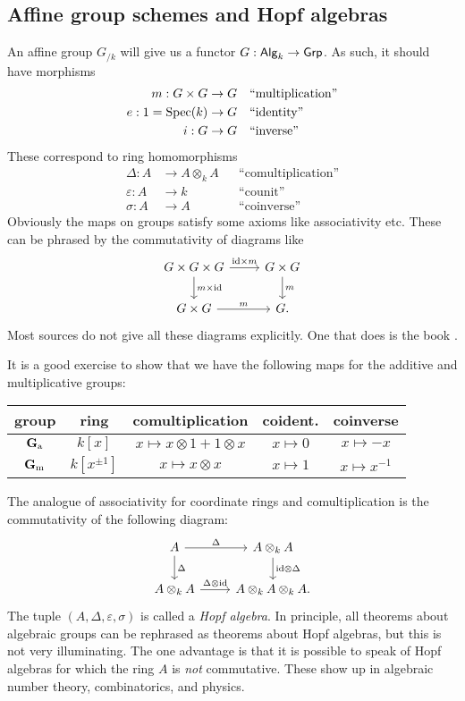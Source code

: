 \subsection{Affine group schemes and Hopf algebras}

An affine group $G_{/k}$ will give us a functor $G:\mathsf{Alg}_{k}\to \mathsf{Grp}$. As 
such, it should have morphisms 
\begin{align*}
  m :G\times G &\to G && \text{``multiplication''} \\
  e:1=\operatorname{Spec}(k) &\to G && \text{``identity''} \\
  i:G &\to G && \text{``inverse''}
\end{align*}
These correspond to ring homomorphisms 
\begin{align*}
  \Delta:A &\to A\otimes_k A && \text{``comultiplication''} \\
  \varepsilon : A &\to k && \text{``counit''} \\
  \sigma:A &\to A && \text{``coinverse''}
\end{align*}
Obviously the maps on groups satisfy some axioms like associativity etc. These 
can be phrased by the commutativity of diagrams like 
\[\begin{tikzcd}
  G\times G\times G \ar[r, "\id\times m"] \ar[d, "m\times \id"] 
    & G\times G \ar[d, "m"] \\ 
  G\times G \ar[r, "m"] 
    & G .
\end{tikzcd}\]
Most sources do not give all these diagrams explicitly. One that does is 
the book \cite{waterhouse-1979}. 

It is a good exercise to show that we have the following maps for the additive 
and multiplicative groups:
\begin{center}
\begin{tabular}{c|cccc}
group & ring & comultiplication & coident. & coinverse \\ \hline
$\mathbf{G}_\mathrm{a}$ & $k[x]$ & $x\mapsto x\otimes 1+1\otimes x$ & $x\mapsto 0$ & $x\mapsto -x$ \\
$\mathbf{G}_\mathrm{m}$ & $k[x^{\pm 1}]$ & $x\mapsto x\otimes x$ & $x\mapsto 1$ & $x\mapsto x^{-1}$
\end{tabular}
\end{center}
The analogue of associativity for coordinate rings and comultiplication is the 
commutativity of the following diagram:
\[\begin{tikzcd}
  A \ar[r, "\Delta"] \ar[d, "\Delta"] 
    & A\otimes_k A \ar[d, "\id\otimes \Delta"] \\
  A\otimes_k A \ar[r, "\Delta\otimes \id"] 
    & A\otimes_k A\otimes_k A .
\end{tikzcd}\]
The tuple $(A,\Delta,\varepsilon,\sigma)$ is called a \emph{Hopf algebra}. In 
principle, all theorems about algebraic groups can be rephrased as theorems 
about Hopf algebras, but this is not very illuminating. The one advantage is 
that it is possible to speak of Hopf algebras for which the ring $A$ is 
\emph{not} commutative. These show up in algebraic number theory, combinatorics, 
and physics. 

